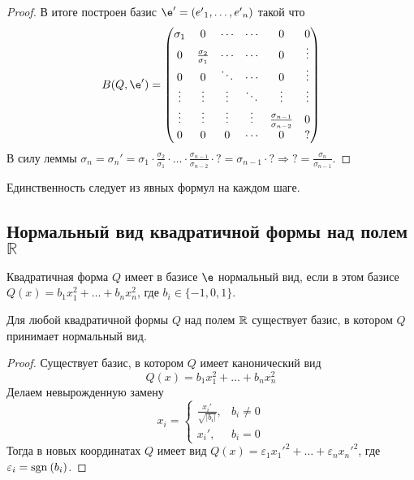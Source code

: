 \begin{Theorem}
\begin{proof}
    В итоге построен базис $\e' = \vector{e'}$ такой что
    \[
    B(Q, \e') = 
    \begin{pmatrix}
      \sigma_1 & 0 & \cdots & \cdots & 0 & 0 \\
      0 & \frac{\sigma_2}{\sigma_1} & \cdots & \cdots & 0 & \vdots \\
      0 & 0 & \ddots & \cdots & 0 & \vdots \\
      \vdots & \vdots & \vdots & \ddots & \vdots & \vdots \\
      \vdots & \vdots & \vdots & \vdots & \frac{\sigma_{n - 1}}{\sigma_{n - 2}} & 0 \\
      0 & 0 & 0 & \cdots & 0 & ?
    \end{pmatrix}
    \]
    В силу леммы $\displaystyle \sigma_n = \sigma_n' = \sigma_1 \cdot \frac{\sigma_2}{\sigma_1} \cdot \ldots \cdot \frac{\sigma_{n - 1}}{\sigma_{n - 2}} \cdot ? = \sigma_{n - 1} \cdot ? \Rightarrow ? = \frac{\sigma_n}{\sigma_{n - 1}}$.
  \end{proof}

\end{Theorem}

\begin{Note}
  Единственность следует из явных формул на каждом шаге.
\end{Note}

\subsection*{Нормальный вид квадратичной формы над полем $\mathbb{R}$}
%

\begin{Def}
  Квадратичная форма $Q$ имеет в базисе $\e$ нормальный вид, если в этом базисе $Q(x) = b_1x_1^2 + \ldots + b_nx_n^2$, где $b_i \in \{-1, 0, 1\}$.
\end{Def}

\begin{Suggestion}
  Для любой квадратичной формы $Q$ над полем $\mathbb{R}$ существует базис, в котором $Q$ принимает нормальный вид.
  \begin{proof}
    Существует базис, в котором $Q$ имеет канонический вид
    \[
    Q(x) = b_1x_1^2 + \ldots + b_nx_n^2
    \]
    Делаем невырожденную замену
    \[
    x_i =
    \begin{cases}
      \frac{x_i'}{\sqrt{|b_i|}}, &b_i \neq 0 \\
      x_i', &b_i = 0
    \end{cases}
    \]
    Тогда в новых координатах $Q$ имеет вид $Q(x) = \varepsilon_1 x_1'^2 + \ldots + \varepsilon_n x_n'^2$, где $\varepsilon_i = \mathrm{sgn\:}(b_i)$.
  \end{proof}
\end{Suggestion}

